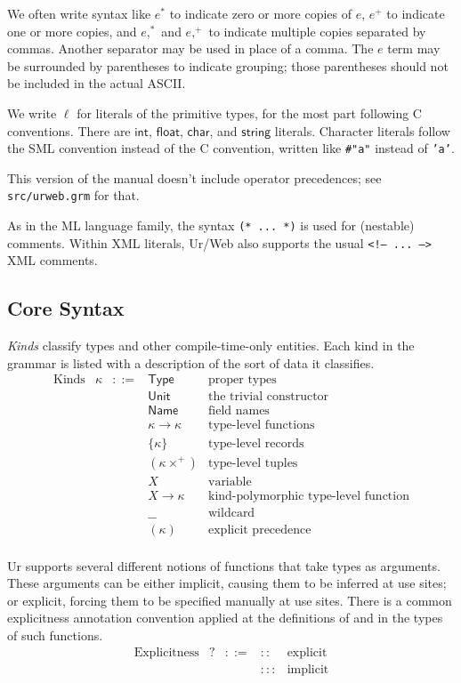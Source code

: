 \documentclass{article}
\newcommand{\mt}[1]{\mathsf{#1}}
\begin{document}
We often write syntax like $e^*$ to indicate zero or more copies of $e$, $e^+$ to indicate one or more copies, and $e,^*$ and $e,^+$ to indicate multiple copies separated by commas.  Another separator may be used in place of a comma.  The $e$ term may be surrounded by parentheses to indicate grouping; those parentheses should not be included in the actual ASCII.

We write $\ell$ for literals of the primitive types, for the most part following C conventions.  There are $\mt{int}$, $\mt{float}$, $\mt{char}$, and $\mt{string}$ literals.  Character literals follow the SML convention instead of the C convention, written like \texttt{\#"a"} instead of \texttt{'a'}.

This version of the manual doesn't include operator precedences; see \texttt{src/urweb.grm} for that.

As in the ML language family, the syntax \texttt{(* ... *)} is used for (nestable) comments.  Within XML literals, Ur/Web also supports the usual \texttt{<!-- ... -->} XML comments.

\subsection{\label{core}Core Syntax}

\emph{Kinds} classify types and other compile-time-only entities.  Each kind in the grammar is listed with a description of the sort of data it classifies.
$$\begin{array}{rrcll}
  \textrm{Kinds} & \kappa &::=& \mt{Type} & \textrm{proper types} \\
  &&& \mt{Unit} & \textrm{the trivial constructor} \\
  &&& \mt{Name} & \textrm{field names} \\
  &&& \kappa \to \kappa & \textrm{type-level functions} \\
  &&& \{\kappa\} & \textrm{type-level records} \\
  &&& (\kappa\times^+) & \textrm{type-level tuples} \\
  &&& X & \textrm{variable} \\
  &&& X \longrightarrow \kappa & \textrm{kind-polymorphic type-level function} \\
  &&& \_\_ & \textrm{wildcard} \\
  &&& (\kappa) & \textrm{explicit precedence} \\
\end{array}$$

Ur supports several different notions of functions that take types as arguments.  These arguments can be either implicit, causing them to be inferred at use sites; or explicit, forcing them to be specified manually at use sites.  There is a common explicitness annotation convention applied at the definitions of and in the types of such functions.
$$\begin{array}{rrcll}
  \textrm{Explicitness} & ? &::=& :: & \textrm{explicit} \\
  &&& ::: & \textrm{implicit}
\end{array}$$
\end{document}

